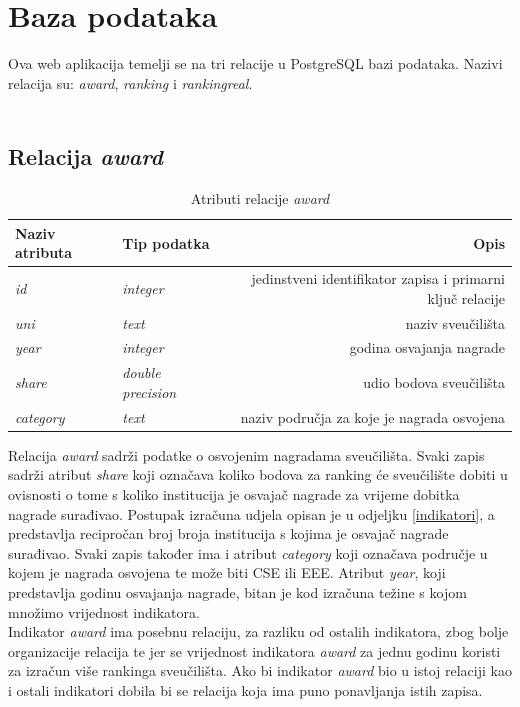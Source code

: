 \documentclass[times, utf8, zavrsni]{fer}
\begin{document}
\section{Baza podataka}
Ova web aplikacija temelji se na tri relacije u PostgreSQL bazi podataka. Nazivi relacija su: \emph{award}, \emph{ranking} i \emph{rankingreal}.
\\\\\subsection{Relacija \emph{award}}
\begin{table}[htb]
    \caption{Atributi relacije \emph{award}}
        \label{tbl:award}
        \centering
        \begin{tabular}{llr} \hline
        Naziv atributa & Tip podatka & Opis\\ \hline
        \emph{id} &  \emph{integer} & jedinstveni identifikator zapisa i primarni ključ relacije\\
        \emph{uni} &  \emph{text} & naziv sveučilišta\\
        \emph{year} &  \emph{integer} & godina osvajanja nagrade\\
        \emph{share} &  \emph{double precision} & udio bodova sveučilišta\\
        \emph{category} &  \emph{text} & naziv područja za koje je nagrada osvojena\\
        \end{tabular}
        \end{table}    
        \FloatBarrier 
Relacija \emph{award} sadrži podatke o osvojenim nagradama sveučilišta. Svaki zapis sadrži atribut \emph{share} koji označava 
koliko bodova za ranking će sveučilište dobiti u ovisnosti o tome s koliko institucija je osvajač nagrade za vrijeme dobitka nagrade
surađivao. Postupak izračuna udjela opisan je u odjeljku \ref{indikatori}, a predstavlja recipročan broj broja institucija s kojima je osvajač 
nagrade surađivao. Svaki zapis također ima i atribut \emph{category} koji označava područje u kojem je nagrada osvojena te može biti CSE ili EEE.
Atribut \emph{year}, koji predstavlja godinu osvajanja nagrade, bitan je kod izračuna težine s kojom množimo vrijednost indikatora.
\\Indikator \emph{award} ima posebnu relaciju, za razliku od ostalih indikatora, zbog bolje organizacije relacija te jer se 
vrijednost indikatora \emph{award} za jednu godinu koristi za izračun više rankinga sveučilišta. Ako bi indikator \emph{award} bio u istoj relaciji
kao i ostali indikatori dobila bi se relacija koja ima puno ponavljanja istih zapisa.
\end{document}
